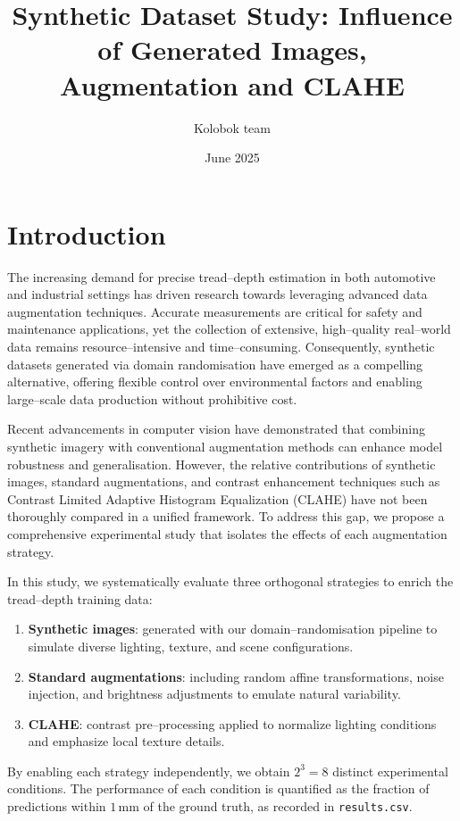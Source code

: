 \documentclass{article}
\author{Kolobok team}
\title{Synthetic Dataset Study: Influence of Generated Images, Augmentation and CLAHE}
\date{June 2025}
\begin{document}
\maketitle

\section{Introduction}
The increasing demand for precise tread–depth estimation in both automotive and industrial settings has driven research towards leveraging advanced data augmentation techniques. Accurate measurements are critical for safety and maintenance applications, yet the collection of extensive, high–quality real–world data remains resource–intensive and time–consuming. Consequently, synthetic datasets generated via domain randomisation have emerged as a compelling alternative, offering flexible control over environmental factors and enabling large–scale data production without prohibitive cost.

Recent advancements in computer vision have demonstrated that combining synthetic imagery with conventional augmentation methods can enhance model robustness and generalisation. However, the relative contributions of synthetic images, standard augmentations, and contrast enhancement techniques such as Contrast Limited Adaptive Histogram Equalization (CLAHE) have not been thoroughly compared in a unified framework. To address this gap, we propose a comprehensive experimental study that isolates the effects of each augmentation strategy.

In this study, we systematically evaluate three orthogonal strategies to enrich the tread–depth training data:
\begin{enumerate}
    \item \textbf{Synthetic images}: generated with our domain–randomisation pipeline to simulate diverse lighting, texture, and scene configurations.
    \item \textbf{Standard augmentations}: including random affine transformations, noise injection, and brightness adjustments to emulate natural variability.
    \item \textbf{CLAHE}: contrast pre–processing applied to normalize lighting conditions and emphasize local texture details.
\end{enumerate}
By enabling each strategy independently, we obtain $2^3 = 8$ distinct experimental conditions. The performance of each condition is quantified as the fraction of predictions within $1\,$mm of the ground truth, as recorded in \texttt{results.csv}.
\end{document}
